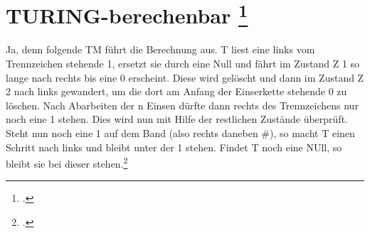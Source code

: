 \documentclass{bschlangaul-aufgabe}
\begin{document}

\section{TURING-berechenbar
\footcite[Aufgabe 3]{theo:ab:4}}

\begin{bAntwort}
Ja, denn folgende TM führt die Berechnung aus. T liest eine links vom
Trennzeichen stehende 1, ersetzt sie durch eine Null und fährt im
Zustand Z 1 so lange nach rechts bis eine 0 erscheint. Diese wird
gelöscht und dann im Zustand Z 2 nach links gewandert, um die dort am
Anfang der Einserkette stehende 0 zu löschen. Nach Abarbeiten der n
Einsen dürfte dann rechts des Trennzeichens nur noch eine 1 stehen. Dies
wird nun mit Hilfe der restlichen Zustände überprüft. Steht nun noch
eine 1 auf dem Band (also rechts daneben \#), so macht T einen Schritt
nach links und bleibt unter der 1 stehen. Findet T noch eine NUll, so
bleibt sie bei dieser stehen.\footcite[Seite 44, Aufgabe 8]{kiesmueller}
\end{bAntwort}
\end{document}
